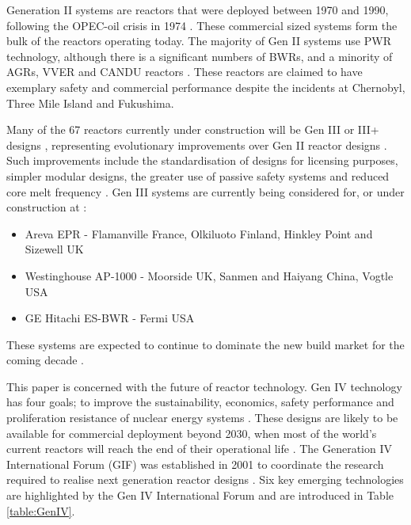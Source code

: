 \documentclass[journal]{IEEEtran}
\begin{document}
Generation II systems are reactors that were deployed between 1970 and 1990, following the OPEC-oil crisis in 1974 \cite{Bhatnagar2011}.
These commercial sized systems form the bulk of the reactors operating today. The majority of Gen II systems use PWR technology, although there is a significant numbers of BWRs, and a minority of AGRs, VVER and CANDU reactors \cite{IAEAReactors2013}. 
These reactors are claimed to have exemplary safety and commercial performance \cite{Locatelli2013, goldberg2011nuclear, Bhatnagar2011, GenIVRoadmap} despite the incidents at Chernobyl, Three Mile Island and Fukushima.

Many of the 67 reactors currently under construction will be Gen III or III+ designs \cite{IAEAReactors2013}, representing evolutionary improvements over Gen II reactor designs \cite{Marques2010a}. 
Such improvements include the standardisation of designs for licensing purposes, simpler modular designs, the greater use of passive safety systems and reduced core melt frequency \cite{schneider2012nuclear, Marques2010a}. 
Gen III systems are currently being considered for, or under construction at \cite{IAEAReactors2013}:
\begin{itemize}
\item Areva EPR - Flamanville France, Olkiluoto Finland, Hinkley Point and Sizewell UK
\item Westinghouse AP-1000 - Moorside UK, Sanmen and Haiyang China, Vogtle USA
\item GE Hitachi ES-BWR - Fermi USA
\end{itemize}
These systems are expected to continue to dominate the new build market for the coming decade \cite{Marques2010a}.

This paper is concerned with the future of reactor technology. Gen IV technology has four goals; to improve the sustainability, economics, safety performance and proliferation resistance of nuclear energy systems \cite{GenIVRoadmap}. 
These designs are likely to be available for commercial deployment beyond 2030, when most of the world's current reactors will reach the end of their operational life \cite{schneider2012nuclear}. 
The Generation IV International Forum (GIF) was established in 2001 to coordinate the research required to realise next generation reactor designs \cite{Marques2010a, GenIVRoadmap}. 
Six key emerging technologies are highlighted by the Gen IV International Forum \cite{GenIVForum} and are introduced in Table \ref{table:GenIV}.
\end{document}
